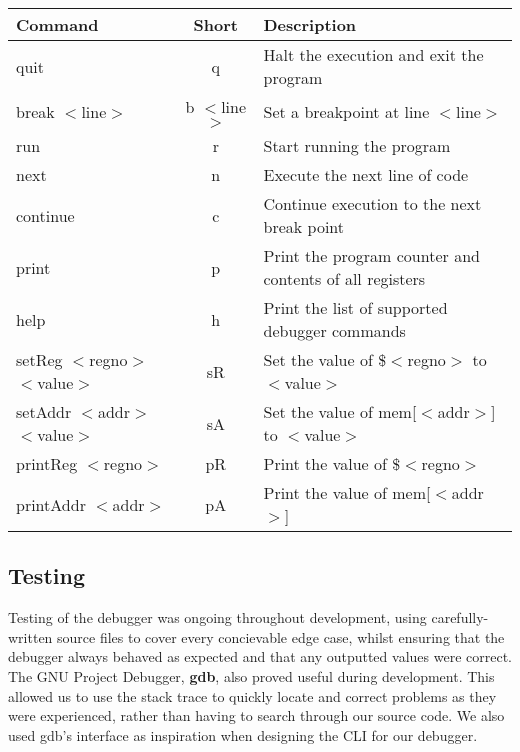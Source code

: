 \documentclass[11pt]{report}
\begin{document}
\begin{adjustwidth}{-.5in}{-.5in} 
	\begin{center} 
	\begin{tabular}{ | l | c | p{5cm} |}
	\hline
	Command & Short & Description \\ \hline
	quit & q & Halt the execution and exit the program \\ \hline
	break $<$line$>$ & b $<$line$>$ & Set a breakpoint at line $<$line$>$ \\ \hline
	run & r & Start running the program \\ \hline
	next & n & Execute the next line of code \\ \hline
	continue & c & Continue execution to the next break point \\ \hline
	print & p & Print the program counter and contents of all registers \\ \hline
	help & h & Print the list of supported debugger commands \\ \hline
	setReg $<$regno$>$ $<$value$>$ & sR & Set the value of \$$<$regno$>$ to $<$value$>$ \\ \hline
	setAddr $<$addr$>$ $<$value$>$ & sA & Set the value of mem[$<$addr$>$] to $<$value$>$ \\ \hline
	printReg $<$regno$>$ & pR & Print the value of \$$<$regno$>$ \\ \hline
	printAddr $<$addr$>$ & pA & Print the value of mem[$<$addr$>$] \\ \hline
	\end{tabular}
	\end{center}
\end{adjustwidth}

\subsection*{Testing}

Testing of the debugger was ongoing throughout development, using carefully-written
source files to cover every concievable edge case, whilst ensuring that the debugger
always behaved as expected and that any outputted values were correct. The GNU
Project Debugger, \textbf{gdb}, also proved useful during development. This allowed
us to use the stack trace to quickly locate and correct problems as they were
experienced, rather than having to search through our source code. We also used
gdb's interface as inspiration when designing the CLI for our debugger.

\newpage
\end{document}
